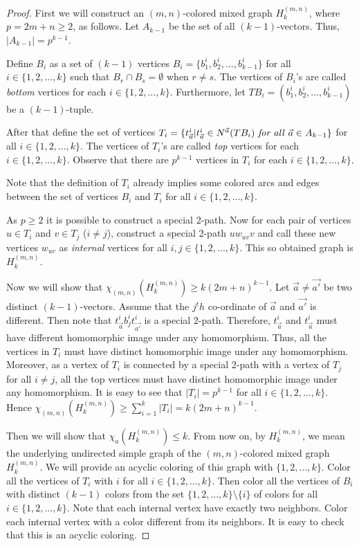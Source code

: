 \documentclass[11pt]{article}
\begin{document}
\begin{proof}
First we will construct an $(m,n)$-colored mixed graph $H_k^{(m,n)}$, where $p = 2m+n \geq 2$, as follows. 
Let $A_{k-1}$ be the set of all $(k-1)$-vectors. 
Thus, $|A_{k-1}| = p^{k-1}$.  

Define $B_i$ as a set of $(k-1)$ vertices $B_i = \{b^i_1, b^i_2, ...,b^i_{k-1}\}$ for all $i \in \{1, 2, ..., k\}$ such that $B_r \cap B_s = \emptyset$ when $r \neq s$. The vertices of $B_i$'s are called \textit{bottom} vertices for each $i \in \{1, 2, ..., k\}$.
Furthermore, let $TB_i = (b^i_1, b^i_2, ...,b^i_{k-1})$ be a $(k-1)$-tuple.  

After that define the set of  vertices $T_i = \{t^i_{\vec{a}}| t^i_{\vec{a}} \in N^{\vec{a}}(TB_i) \text{ \textit{for all} } \vec{a} \in A_{k-1}\}$ 
for all $i \in \{1, 2, ..., k\}$.  
The vertices of $T_i$'s are called \textit{top} vertices for each $i \in \{1, 2, ..., k\}$. 
Observe that there are $p^{k-1}$ vertices in $T_i$ for each $i  \in \{1, 2, ..., k\}$.

Note that the definition of $T_i$ already implies some colored arcs and edges between the set of vertices 
$B_i$ and $T_i$ for all   $i \in \{1, 2, ..., k\}$. 


As $p \geq 2$ it is possible to construct a special 2-path. 
Now for each  pair of vertices $u \in T_i$ and $v \in T_j$ ($i \neq j$), construct a special 2-path $uw_{uv}v$ and  call these new vertices $w_{uv}$ as 
\textit{internal} vertices for all $i, j \in \{1, 2, ..., k\}$.
This so obtained graph is $H_k^{(m,n)}$.

Now we will show that $\chi_{(m,n)}(H_k^{(m,n)}) \geq k(2m+n)^{k-1}$. 
Let $\vec{a} \neq \vec{a'}$ be two distinct 
$(k-1)$-vectors. 
Assume that the $j^th$ co-ordinate of $\vec{a}$ and  $\vec{a'}$ is different. 
Then note that $t^i_{\vec{a}}b^i_jt^i_{\vec{a'}}$ is a special 2-path. 
Therefore, $t^i_{\vec{a}}$ and $t^i_{\vec{a}}$ must have different homomorphic image under any homomorphism. 
Thus, all the vertices in $T_i$ must have distinct homomorphic image under any homomorphism. 
Moreover, as a vertex of $T_i$ is connected by a special 2-path with a vertex of $T_j$ for all $i \neq j$, all the top vertices must have distinct 
homomorphic image under any homomorphism. It is easy to see that $|T_i| =  p^{k-1}$ for all   $i \in \{1, 2, ..., k\}$.
Hence $\chi_{(m,n)}(H_k^{(m,n)}) \geq \sum_{i=1}^k |T_i| = k(2m+n)^{k-1}$.


 Then we will show that $\chi_{a}(H_k^{(m,n)}) \leq k$. From now on, by $H_k^{(m,n)}$, we mean the underlying undirected simple graph of the 
 $(m,n)$-colored mixed graph $H_k^{(m,n)}$. We will provide an acyclic coloring of this graph with $\{1,2,...,k\}$.
 Color all the vertices of $T_i$ with $i$ for all $i \in \{1,2,...,k\}$. Then color all the vertices of $B_i$ with distinct $(k-1)$ colors 
 from the set $\{1,2,...,k\} \setminus \{i\}$ of colors for all $i \in \{1,2,...,k\}$.
Note that each internal vertex have exactly two neighbors. Color each internal vertex with a color different from its neighbors.
It is easy to check that this is an acyclic coloring. 


\end{proof}
\end{document}
